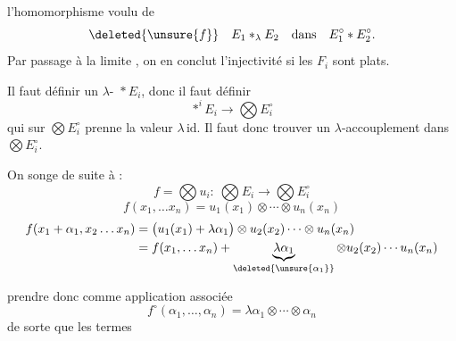 l'homomorphisme voulu de
\[
\deleted{\unsure{f}}\quad E_1\mathbin{*}_{\lambda}E_2\quad\text{dans}\quad E_1^\circ * E_2^\circ.
\]
Par passage à la limite , on en conclut l'injectivité si les $F_i$ sont plats.

Il faut définir un $\lambda$-  $\mathop{*}E_i$, donc il faut définir
\[
\mathop{*}^{i}E_i\longrightarrow\bigotimes E_i^\circ
\]
qui sur $\bigotimes E_i^\circ$ prenne la valeur $\lambda\,\mathrm{id}$.
Il faut donc trouver un $\lambda$-accouplement  dans $\bigotimes E_i^\circ$.

On songe  de suite à :
\[
f=\bigotimes u_i:\ \bigotimes E_i\longrightarrow\bigotimes E_i^\circ
\]
\[
f(x_1,\ldots x_n)=u_1(x_1)\otimes\cdots\otimes u_n(x_n)
\]
\[
\begin{aligned}
f(x_1+\alpha_1,x_2\ldots x_n)
 &=\bigl(u_1(x_1)+\lambda\alpha_1\bigr)\otimes u_2(x_2)\cdots\otimes u_n(x_n)\\
 &=f(x_1,\ldots x_n)+\underbrace{\lambda\alpha_1}_{\deleted{\unsure{\alpha_1}}}\otimes u_2(x_2)\cdots u_n(x_n)
\end{aligned}
\]

prendre donc comme application associée
\[
f^\circ(\alpha_1,\ldots,\alpha_n)=\lambda\alpha_1\otimes\cdots\otimes\alpha_n
\]
de sorte que les termes  
